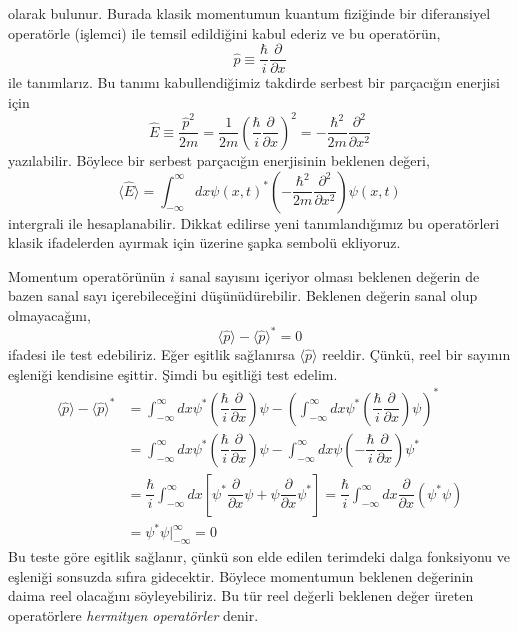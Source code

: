\documentclass[00_kitap.tex]{subfiles}
\begin{document}
olarak bulunur. Burada klasik momentumun kuantum fiziğinde bir diferansiyel operatörle (işlemci) ile temsil edildiğini kabul ederiz ve bu operatörün,
\begin{equation}
\hat p \equiv \dfrac {\hbar }{i}\dfrac {\partial}{\partial x}
\end{equation}
ile tanımlarız. Bu tanımı kabullendiğimiz takdirde serbest bir parçacığın enerjisi için
\begin{equation}
\hat E \equiv \dfrac{\hat p^2}{2 m} = \dfrac {1 }{2 m}\left(\dfrac {\hbar }{i}\dfrac {\partial}{\partial x}\right)^2 = -\dfrac {\hbar^2 }{2 m}\dfrac {\partial^2}{\partial x^2}
\end{equation}
yazılabilir. Böylece bir serbest parçacığın enerjisinin beklenen değeri,
\begin{equation}
\langle \hat E\rangle =  \int ^{\infty }_{-\infty }dx \psi(x,t) ^{\ast }\left(-\dfrac {\hbar^2 }{2 m}\dfrac {\partial^2}{\partial x^2}\right) \psi(x,t)
\label{eq:expactation_value_and_op_energy}
\end{equation}
intergrali ile hesaplanabilir. Dikkat edilirse yeni tanımlandığımız bu operatörleri klasik ifadelerden ayırmak için üzerine şapka sembolü ekliyoruz.

Momentum operatörünün $i$ sanal sayısını içeriyor olması beklenen değerin de bazen sanal sayı içerebileceğini düşünüdürebilir. Beklenen değerin sanal olup olmayacağını,
\begin{equation}
\langle \hat p \rangle - \langle \hat p \rangle^\ast = 0
\end{equation}
ifadesi ile test edebiliriz. Eğer eşitlik sağlanırsa $\langle \hat p \rangle$ reeldir. Çünkü, reel bir sayının eşleniği kendisine eşittir. Şimdi bu eşitliği test edelim.
\begin{align*}
\langle \hat p \rangle - \langle \hat p \rangle^\ast &= \int ^{\infty }_{-\infty }dx \psi ^{\ast }\left(\dfrac {\hbar }{i}\dfrac {\partial}{\partial x}\right) \psi - \left(  \int ^{\infty }_{-\infty }dx \psi ^{\ast }\left(\dfrac {\hbar }{i}\dfrac {\partial}{\partial x}\right) \psi  \right)^\ast \\
&= \int ^{\infty }_{-\infty }dx \psi ^{\ast }\left(\dfrac {\hbar }{i}\dfrac {\partial}{\partial x}\right) \psi -   \int ^{\infty }_{-\infty }dx \psi \left(-\dfrac {\hbar }{i}\dfrac {\partial}{\partial x}\right) \psi^\ast \\
&= \dfrac {\hbar }{i} \int ^{\infty }_{-\infty }dx \left[\psi ^{\ast } \dfrac {\partial}{\partial x} \psi +  \psi \dfrac {\partial}{\partial x}\psi^\ast\right] = \dfrac {\hbar }{i} \int ^{\infty }_{-\infty }dx \dfrac {\partial}{\partial x}\left( \psi ^{\ast } \psi\right)\\
&=\psi^\ast \psi {\bigg |}^{\infty}_{-\infty} = 0
\end{align*}
Bu teste göre eşitlik sağlanır, çünkü son elde edilen terimdeki dalga fonksiyonu ve eşleniği sonsuzda sıfıra gidecektir. Böylece momentumun beklenen değerinin daima reel olacağını söyleyebiliriz. Bu tür reel değerli beklenen değer üreten operatörlere \emph{hermityen operatörler} denir.
\end{document}
